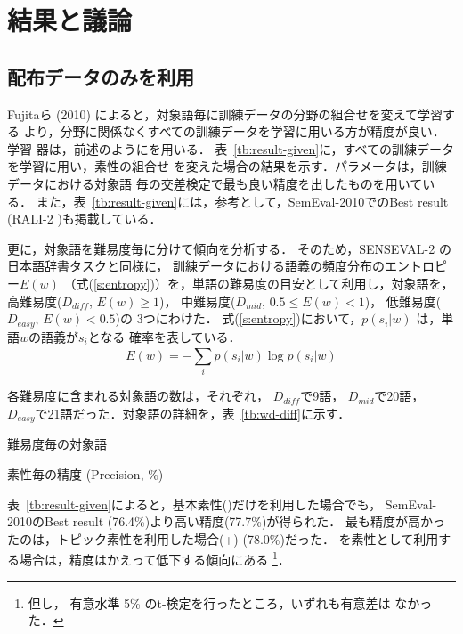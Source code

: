 \documentclass[japanese]{jnlp_1.4}
\newcommand{\bl}{}
\newcommand{\bow}{}
\newcommand{\tp}[1]{}
\newcommand{\MEM}{}
\begin{document}
\section{結果と議論}
\label{sec:result}


\subsection{配布データのみを利用} 
\label{sec:result-given}

Fujitaら (2010) によると，対象語毎に訓練データの分野の組合せを変えて学習する
より，分野に関係なくすべての訓練データを学習に用いる方が精度が良い．学習
器は，前述のように\MEM{}を用いる．
表~\ref{tb:result-given}に，すべての訓練データを学習に用い，素性の組合せ
を変えた場合の結果を示す．パラメータは，訓練データにおける対象語
毎の交差検定で最も良い精度を出したものを用いている．
また，表~\ref{tb:result-given}には，参考として，SemEval-2010でのBest result
(RALI-2 \cite{Brosseauvilleneuve:Kando:Nie:2010})も掲載している．

更に，対象語を難易度毎に分けて傾向を分析する．
そのため，SENSEVAL-2 の日本語辞書タスクと同様に，
訓練データにおける語義の頻度分布のエントロピー$E(w)$
（式(\ref{s:entropy})）を，単語の難易度の目安として利用し，対象語を，
高難易度($D_{diff}$, $E(w) \geq 1 $)，
中難易度($D_{mid}$, $0.5 \leq E(w) < 1 $)，
低難易度($D_{easy}$, $E(w) < 0.5 $)の
3つにわけた\cite{Shirai:2003j}．
式(\ref{s:entropy})において，$p(s_{i}|w)$ は，単語$w$の語義が$s_i$となる
確率を表している．
\begin{equation}
\label{s:entropy}
E(w) = - \sum_{i}^{} p(s_{i}|w) \log {p(s_{i}|w)}
\end{equation}



各難易度に含まれる対象語の数は，それぞれ，
$D_{diff}$で9語，
$D_{mid}$で20語，
$D_{easy}$で21語だった．対象語の詳細を，表~\ref{tb:wd-diff}に示す．


\begin{table}[t]
\caption{難易度毎の対象語} 
\label{tb:wd-diff}

\end{table}
\begin{table}[t]
\caption{素性毎の精度 (Precision, \%)} 
\label{tb:result-given}

\end{table}

表~\ref{tb:result-given}によると，基本素性(\bl)だけを利用した場合でも，
SemEval-2010のBest result (76.4\%)より高い精度(77.7\%)が得られた．
最も精度が高かったのは，トピック素性を利用した場合(\bl +\tp{200})
(78.0\%)だった．
\bow{}を素性として利用する場合は，精度はかえって低下する傾向にある
\footnote{但し，
有意水準 5\% のt-検定を行ったところ，いずれも有意差は
なかった．}．
\end{document}
